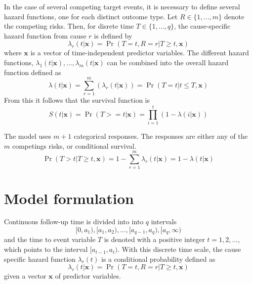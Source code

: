In the case of several competing target events,
it is necessary to define several hazard functions,
one for each distinct outcome type.
Let \(R \in \{1, ..., m\}\) denote the competing risks.
Then, for disrete time \(T \in \{1, ..., q\}\), 
the cause-specific hazard function from cause $r$ is defined by
%
\begin{equation*}
    \lambda_{r}(t | \mathbf{x}) = \Pr (T = t, R = r | T \geq t, \mathbf{x})
\end{equation*}
%
where \(\mathbf{x}\) is a vector of time-independent predictor variables. 
The different hazard functions, 
\(\lambda_{1}(t|\mathbf{x}), ..., \lambda_{m}(t|\mathbf{x})\) 
can be combined into the overall hazard function defined as
%
\begin{equation}
    \lambda(t|\mathbf{x}) 
    = \sum_{r=1}^{m}(\lambda_{r}(t|\mathbf{x}))
    = \Pr(T = t | t \leq T, \mathbf{x})
\end{equation}
%
From this it follows that the survival function is
%
\begin{equation}
    S(t|\mathbf{x})
    = \Pr(T >= t|\mathbf{x})
    = \prod_{i=1}^{t}(1 - \lambda(i|\mathbf{x}))
\end{equation}

The model uses $m + 1$ categorical responses.
The responses are either any of the $m$ competings risks, 
or conditional survival.
%
\begin{equation}
    \Pr(T > t | T \geq t, \mathbf{x})
    = 1 - \sum_{r = 1}^{m} \lambda_r (t | \mathbf{x})
    = 1 - \lambda (t | \mathbf{x})
\end{equation}

\section{Model formulation}

Continuous follow-up time is divided into into $q$ intervals
%
\begin{equation*}
	[0, a_1), [a_1, a_2), ..., [a_{q-1}, a_q), [a_{q}, \infty)
\end{equation*}
%
and the time to event variable \(T\) is denoted 
with a positive integer \(t = 1, 2, ...\),
which points to the interval \([a_{t-1}, a_{t})\).
With this discrete time scale,
the cause specific hazard function \(\lambda_{r}(t)\) is a conditional probability defined as
%
\begin{equation*}
    \lambda_{r}(t | \mathbf{x}) = \Pr (T = t, R = r | T \geq t, \mathbf{x})
\end{equation*}
%
given a vector \(\mathbf{x}\) of predictor variables.

